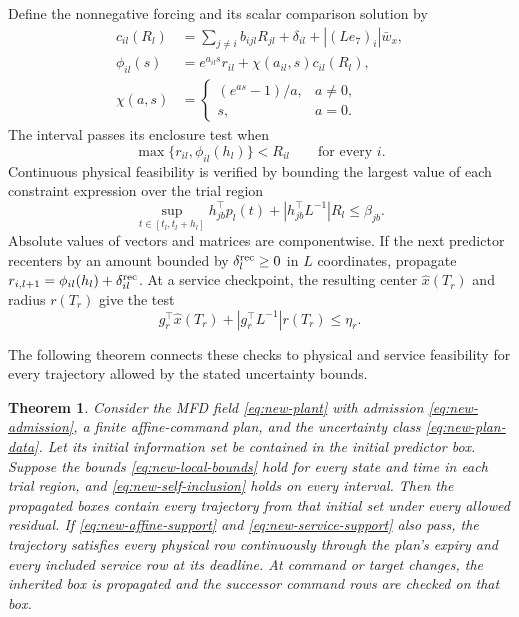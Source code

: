 \documentclass[preprint,12pt]{elsarticle}
\newtheorem{theorem}{Theorem}
\begin{document}
Define the nonnegative forcing and its scalar comparison solution by
\begin{align}
 c_{il}(R_l)&=\sum_{j\ne i}b_{ijl}R_{jl}
                 +\delta_{il}+|(Le_7)_i|\bar w_x,\nonumber\\
 \phi_{il}(s)&=e^{a_{il}s}r_{il}
                  +\chi(a_{il},s)c_{il}(R_l),\nonumber\\
 \chi(a,s)&=\begin{cases}(e^{as}-1)/a,&a\ne0,\\s,&a=0.\end{cases}
 \label{eq:new-component-comparison}
\end{align}
The interval passes its enclosure test when
\begin{equation}
 \max\{r_{il},\phi_{il}(h_l)\}<R_{il}
 \qquad\text{for every }i.
 \label{eq:new-self-inclusion}
\end{equation}
Continuous physical feasibility is verified by bounding the largest
value of each constraint expression over the trial region
\begin{equation}
 \sup_{t\in[t_l,t_l+h_l]}h_{jb}^{\top}p_l(t)
             +|h_{jb}^{\top}L^{-1}|R_l\le\beta_{jb}.
 \label{eq:new-affine-support}
\end{equation}
Absolute values of vectors and matrices are componentwise. If the next
predictor recenters by an amount bounded by $\delta^{\rm rec}_l\ge0$ in $L$ coordinates,
propagate $r_{i,l+1}=\phi_{il}(h_l)+\delta^{\rm rec}_{il}$. At a service checkpoint,
the resulting center $\widehat x(T_r)$ and radius $r(T_r)$ give the test
\begin{equation}
 g_r^{\top}\widehat x(T_r)+|g_r^{\top}L^{-1}|r(T_r)\le\eta_r.
 \label{eq:new-service-support}
\end{equation}

The following theorem connects these checks to physical and service feasibility for every trajectory allowed by the stated uncertainty bounds.

\begin{theorem}
\label{thm:new-plan-enclosure}
Consider the MFD field \eqref{eq:new-plant} with admission
\eqref{eq:new-admission}, a finite affine-command plan, and the uncertainty
class \eqref{eq:new-plan-data}. Let its initial information set be contained
in the initial predictor box. Suppose the bounds
\eqref{eq:new-local-bounds} hold for every state and time in each trial
region, and
\eqref{eq:new-self-inclusion} holds on every interval. Then the propagated
boxes contain every trajectory from that initial set under every allowed
residual. If \eqref{eq:new-affine-support} and
\eqref{eq:new-service-support} also pass, the trajectory satisfies every
physical row continuously through the plan's expiry and every included
service row at its deadline. At command or target changes, the inherited box
is propagated and the successor command rows are checked on that box.
\end{theorem}
\end{document}
